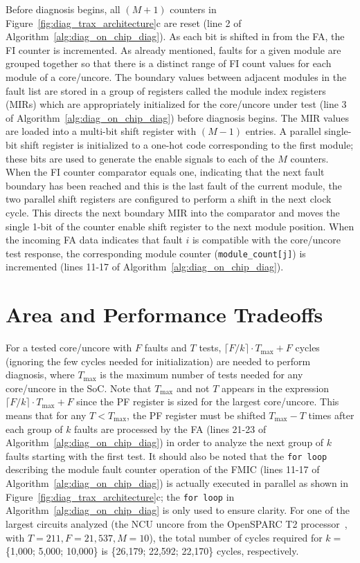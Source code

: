 Before diagnosis begins, all $(M+1)$ counters in Figure~\ref{fig:diag_trax_architecture}c are reset (line 2 of Algorithm~\ref{alg:diag_on_chip_diag}).
%
As each bit is shifted in from the FA, the FI counter is incremented.
%
As already mentioned, faults for a given module are grouped together so that there is a distinct range of FI count values for each module of a core/uncore.
%
The boundary values between adjacent modules in the fault list are stored in a group of registers called the module index registers (MIRs) which are appropriately initialized for the core/uncore under test (line 3 of Algorithm~\ref{alg:diag_on_chip_diag}) before diagnosis begins.
%
The MIR values are loaded into a multi-bit shift register with $(M-1)$ entries.
%
A parallel single-bit shift register is initialized to a one-hot code corresponding to the first module; these bits are used to generate the enable signals to each of the $M$ counters.
%
When the FI counter comparator equals one, indicating that the next fault boundary has been reached and this is the last fault of the current module, the two parallel shift registers are configured to perform a shift in the next clock cycle.
%
This directs the next boundary MIR into the comparator and moves the single 1-bit of the counter enable shift register to the next module position.
%
When the incoming FA data indicates that fault $i$ is compatible with the core/uncore test response, the corresponding module counter (\verb+module_count[j]+) is incremented (lines 11-17 of Algorithm~\ref{alg:diag_on_chip_diag}).

\section{Area and Performance Tradeoffs}
\label{sec:diag_overhead}
For a tested core/uncore with $F$ faults and $T$ tests, $\lceil F / k \rceil \cdot T_{\mbox{max}} + F$ cycles (ignoring the few cycles needed for initialization) are needed to perform diagnosis, where $T_{\mbox{max}}$ is the maximum number of tests needed for any core/uncore in the SoC.
%
Note that $T_{\mbox{max}}$ and not $T$ appears in the expression $\lceil F / k \rceil \cdot T_{\mbox{max}} + F$ since the PF register is sized for the largest core/uncore.
%
This means that for any $T < T_{\mbox{max}}$, the PF register must be shifted $T_{\mbox{max}} - T$ times after each group of $k$ faults are processed by the FA (lines 21-23 of Algorithm~\ref{alg:diag_on_chip_diag}) in order to analyze the next group of $k$ faults starting with the first test.
%
It should also be noted that the \verb+for loop+ describing the module fault counter operation of the FMIC (lines 11-17 of Algorithm~\ref{alg:diag_on_chip_diag}) is actually executed in parallel as shown in Figure~\ref{fig:diag_trax_architecture}c; the \verb+for loop+ in Algorithm~\ref{alg:diag_on_chip_diag} is only used to ensure clarity.
%
For one of the largest circuits analyzed (the NCU uncore from the OpenSPARC T2 processor~\cite{sun11}, with $T=211, F=21,537, M=10$), the total number of cycles required for $k=$ \{1,000; 5,000; 10,000\} is \{26,179; 22,592; 22,170\} cycles, respectively.

